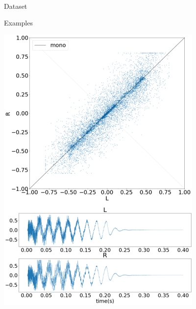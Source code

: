 \begin{frame}{Dataset}
\begin{block}{Examples}
\begin{minipage}{.24\textwidth}
        \includegraphics[width=0.9\linewidth]{Presentation/figures/dataset_example_3.png}
    \end{minipage}
    \begin{minipage}{.24\textwidth}
        \centering

\end{minipage}
\end{block}
\end{frame}
